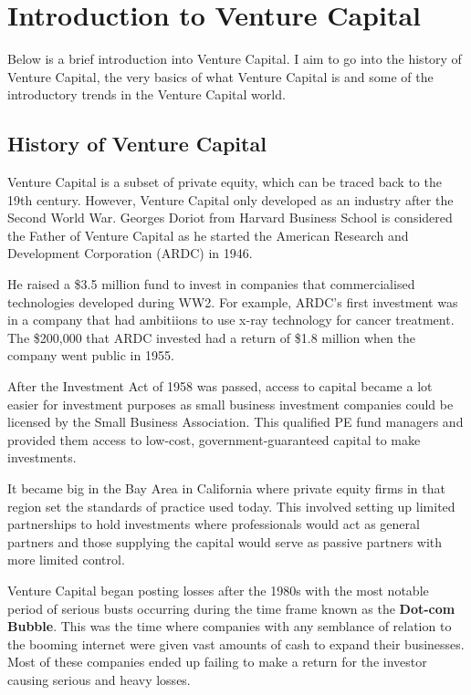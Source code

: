 \documentclass[a4paper]{article}
\begin{document}
{\newpage
\pagestyle{empty}
\tableofcontents

\newpage
\pagestyle{fancy}

\section{Introduction to Venture Capital}
Below is a brief introduction into Venture Capital. I aim to go into the history of Venture Capital, the very basics of what Venture Capital is and some of the introductory trends in the Venture Capital world.

\subsection{History of Venture Capital}
Venture Capital is a subset of private equity, which can be traced back to the 19th century. However, Venture Capital only developed as an industry after the Second World War. Georges Doriot from Harvard Business School is considered the Father of Venture Capital as he started the American Research and Development Corporation (ARDC) in 1946.

\vspace{5pt}
\noindent He raised a \$3.5 million fund to invest in companies that commercialised technologies developed during WW2. For example, ARDC's first investment was in a company that had ambitiions to use x-ray technology for cancer treatment. The \$200,000 that ARDC invested had a return of \$1.8 million when the company went public in 1955.

\vspace{5pt}
\noindent After the Investment Act of 1958 was passed, access to capital became a lot easier for investment purposes as small business investment companies could be licensed by the Small Business Association. This qualified PE fund managers and provided them access to low-cost, government-guaranteed capital to make investments.

\vspace{5pt}
\noindent It became big in the Bay Area in California where private equity firms in that region set the standards of practice used today. This involved setting up limited partnerships to hold investments where professionals would act as general partners and those supplying the capital would serve as passive partners with more limited control.

\vspace{5pt}
\noindent Venture Capital began posting losses after the 1980s with the most notable period of serious busts occurring during the time frame known as the \textbf{Dot-com Bubble}. This was the time where companies with any semblance of relation to the booming internet were given vast amounts of cash to expand their businesses. Most of these companies ended up failing to make a return for the investor causing serious and heavy losses.

}
\end{document}
